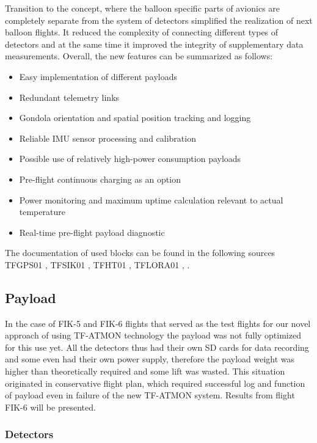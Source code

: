 \documentclass{Rpd}
\begin{document}
Transition to the concept, where the balloon specific parts of avionics are completely separate from the system of detectors simplified the realization of next balloon flights. It reduced the complexity of connecting different types of detectors and at the same time it improved the integrity of supplementary data measurements. Overall, the new features can be summarized as follows:

\begin{itemize}
\item Easy implementation of different payloads
\item Redundant telemetry links
\item Gondola orientation and spatial position tracking and logging
\item Reliable IMU sensor processing and calibration
\item Possible use of relatively high-power consumption payloads
\item Pre-flight continuous charging as an option
\item Power monitoring and maximum uptime calculation relevant to actual temperature
\item Real-time pre-flight payload diagnostic
\end{itemize}

The documentation of used blocks can be found in the following sources TFGPS01 \cite{TFGPS01}, TFSIK01 \cite{TFSIK01}, TFHT01 \cite{TFHT01}, TFLORA01 \cite{TFLORA01}, \cite{LION2CELL01D}.


\subsection{Payload}

In the case of FIK-5 and FIK-6 flights that served as the test flights for our novel approach of using TF-ATMON technology the payload was not fully optimized for this use yet. All the detectors thus had their own SD cards for data recording and some even had their own power supply, therefore the payload weight was higher than theoretically required and some lift was wasted. This situation originated in conservative flight plan, which required successful log and function of payload even in failure of the new TF-ATMON system. Results from flight FIK-6 will be presented.

\subsubsection{Detectors}
\end{document}
